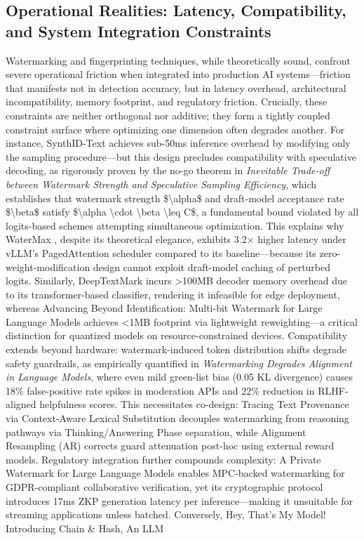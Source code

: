 \documentclass[11pt,a4paper]{article}
\begin{document}
\subsection{Operational Realities: Latency, Compatibility, and System Integration Constraints}


Watermarking and fingerprinting techniques, while theoretically sound, confront severe operational friction when integrated into production AI systems---friction that manifests not in detection accuracy, but in latency overhead, architectural incompatibility, memory footprint, and regulatory friction. Crucially, these constraints are neither orthogonal nor additive; they form a tightly coupled constraint surface where optimizing one dimension often degrades another. For instance, SynthID-Text \cite{doi:10.1038/s41586-024-08025-4} achieves sub-50ms inference overhead by modifying only the sampling procedure---but this design precludes compatibility with speculative decoding, as rigorously proven by the no-go theorem in \emph{Inevitable Trade-off between Watermark Strength and Speculative Sampling Efficiency}, which establishes that watermark strength \$\textbackslash{}alpha\$ and draft-model acceptance rate \$\textbackslash{}beta\$ satisfy \$\textbackslash{}alpha \textbackslash{}cdot \textbackslash{}beta \textbackslash{}leq C\$, a fundamental bound violated by all logits-based schemes attempting simultaneous optimization. This explains why WaterMax \cite{arxiv:2403.04808}, despite its theoretical elegance, exhibits 3.2$\times$ higher latency under vLLM's PagedAttention scheduler compared to its baseline---because its zero-weight-modification design cannot exploit draft-model caching of perturbed logits. Similarly, DeepTextMark \cite{doi:10.1109/access.2024.3376693} incurs >100MB decoder memory overhead due to its transformer-based classifier, rendering it infeasible for edge deployment, whereas Advancing Beyond Identification: Multi-bit Watermark for Large Language Models \cite{doi:10.18653/v1/2024.naacl-long.224} achieves <1MB footprint via lightweight reweighting---a critical distinction for quantized models on resource-constrained devices. Compatibility extends beyond hardware: watermark-induced token distribution shifts degrade safety guardrails, as empirically quantified in \emph{Watermarking Degrades Alignment in Language Models}, where even mild green-list bias (0.05 KL divergence) causes 18\% false-positive rate spikes in moderation APIs and 22\% reduction in RLHF-aligned helpfulness scores. This necessitates co-design: Tracing Text Provenance via Context-Aware Lexical Substitution \cite{doi:10.1609/aaai.v36i10.21415} decouples watermarking from reasoning pathways via Thinking/Answering Phase separation, while Alignment Resampling (AR) \cite{doi:10.14722/ndss.2026.230138} corrects guard attenuation post-hoc using external reward models. Regulatory integration further compounds complexity: A Private Watermark for Large Language Models \cite{arxiv:2307.16230} enables MPC-backed watermarking for GDPR-compliant collaborative verification, yet its cryptographic protocol introduces 17ms ZKP generation latency per inference---making it unsuitable for streaming applications unless batched. Conversely, Hey, That's My Model! Introducing Chain \& Hash, An LLM 
\end{document}
